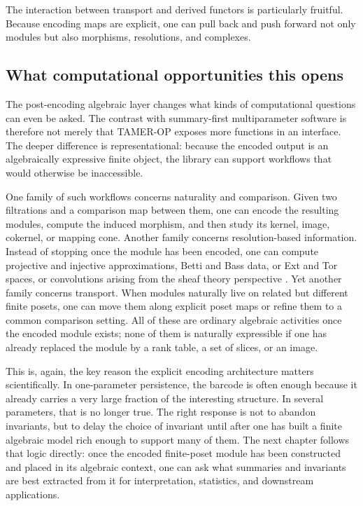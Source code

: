 \documentclass[11pt]{article}
\newcommand{\TAMER}{\textsc{TAMER-OP}}
\theoremstyle{definition}
\theoremstyle{remark}
\begin{document}
The interaction between transport and derived functors is particularly fruitful.  Because encoding maps are explicit, one can pull back and push forward not only modules but also morphisms, resolutions, and complexes.

\subsection{What computational opportunities this opens}

The post-encoding algebraic layer changes what kinds of computational questions can even be asked.  The contrast with summary-first multiparameter software is therefore not merely that \TAMER{} exposes more functions in an interface.  The deeper difference is representational: because the encoded output is an algebraically expressive finite object, the library can support workflows that would otherwise be inaccessible.

One family of such workflows concerns naturality and comparison.  Given two filtrations and a comparison map between them, one can encode the resulting modules, compute the induced morphism, and then study its kernel, image, cokernel, or mapping cone.  Another family concerns resolution-based information.  Instead of stopping once the module has been encoded, one can compute projective and injective approximations, Betti and Bass data, or Ext and Tor spaces, or convolutions arising from the sheaf theory perspective \cite{KS18}.  Yet another family concerns transport.  When modules naturally live on related but different finite posets, one can move them along explicit poset maps or refine them to a common comparison setting.  All of these are ordinary algebraic activities once the encoded module exists; none of them is naturally expressible if one has already replaced the module by a rank table, a set of slices, or an image.

This is, again, the key reason the explicit encoding architecture matters scientifically.  In one-parameter persistence, the barcode is often enough because it already carries a very large fraction of the interesting structure.  In several parameters, that is no longer true.  The right response is not to abandon invariants, but to delay the choice of invariant until after one has built a finite algebraic model rich enough to support many of them.  The next chapter follows that logic directly: once the encoded finite-poset module has been constructed and placed in its algebraic context, one can ask what summaries and invariants are best extracted from it for interpretation, statistics, and downstream applications.
\end{document}
